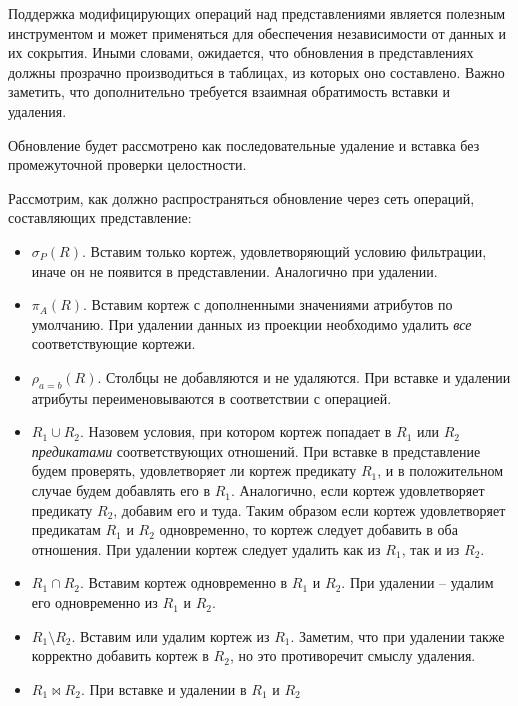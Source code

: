 Поддержка модифицирующих операций над представлениями является полезным инструментом и может
применяться для обеспечения независимости от данных и их сокрытия. Иными словами, ожидается, что
обновления в представлениях должны прозрачно производиться в таблицах, из которых оно составлено.
Важно заметить, что дополнительно требуется взаимная обратимость вставки и удаления.

\begin{remark}
	Обновление будет рассмотрено как последовательные удаление и вставка без промежуточной проверки
	целостности.
\end{remark}

Рассмотрим, как должно распространяться обновление через сеть операций, составляющих представление:

\begin{itemize}
	\item $\sigma_P (R)$. Вставим только кортеж, удовлетворяющий условию фильтрации, иначе
	      он не появится в представлении. Аналогично при удалении.
	\item $\pi_A(R)$. Вставим кортеж с дополненными значениями атрибутов по умолчанию. При
	      удалении данных из проекции необходимо удалить \textit{все} соответствующие кортежи.
	\item $\rho_{a=b}(R)$. Столбцы не добавляются и не удаляются. При вставке и удалении атрибуты
	      переименовываются в соответствии с операцией.
	\item $R_1 \cup R_2$. Назовем условия, при котором кортеж попадает в $R_1$ или
	      $R_2$
	      \textit{предикатами} соответствующих отношений. При вставке в представление будем проверять,
	      удовлетворяет ли кортеж предикату $R_1$, и в положительном случае будем добавлять
	      его в $R_1$. Аналогично, если кортеж удовлетворяет предикату $R_2$,
	      добавим его и туда. Таким образом если кортеж удовлетворяет предикатам $R_1$ и
	      $R_2$ одновременно, то кортеж следует добавить в оба отношения. При удалении
	      кортеж следует удалить как из $R_1$, так и из $R_2$.
	\item $R_1 \cap R_2$. Вставим кортеж одновременно в $R_1$ и
	      $R_2$. При удалении -- удалим его
	      одновременно из $R_1$ и $R_2$.
	\item $R_1 \setminus R_2$. Вставим или удалим кортеж из $R_1$. Заметим, что при
	      удалении также корректно добавить кортеж в $R_2$, но это противоречит смыслу
	      удаления.
	\item $R_1 \bowtie R_2$. При вставке и удалении в $R_1$ и $R_2$

\end{itemize}
